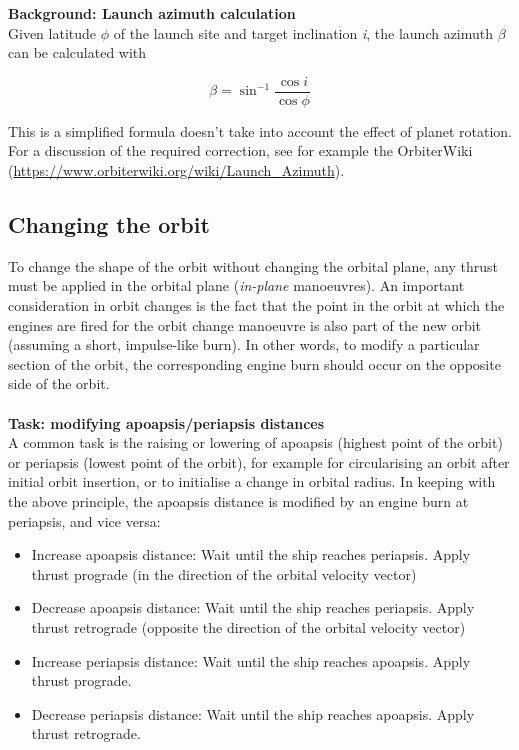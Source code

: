 \documentclass[Orbiter User Manual.tex]{subfiles}
\begin{document}
\noindent
\textbf{Background: Launch azimuth calculation}\\
Given latitude $\phi$ of the launch site and target inclination \textit{i}, the launch azimuth $\beta$ can be calculated with

\[ \beta = \sin^{-1} \frac{\cos i}{\cos \phi} \]

\noindent
This is a simplified formula doesn't take into account the effect of planet rotation. For a discussion of the required correction, see for example the OrbiterWiki (\url{https://www.orbiterwiki.org/wiki/Launch_Azimuth}).


\subsection{Changing the orbit}
\label{ssec:basic_changeorbit}
To change the shape of the orbit without changing the orbital plane, any thrust must be applied in the orbital plane (\textit{in-plane} manoeuvres). An important consideration in orbit changes is the fact that the point in the orbit at which the engines are fired for the orbit change manoeuvre is also part of the new orbit (assuming a short, impulse-like burn). In other words, to modify a particular section of the orbit, the corresponding engine burn should occur on the opposite side of the orbit.\\
\\
\textbf{Task: modifying apoapsis/periapsis distances}\\
A common task is the raising or lowering of apoapsis (highest point of the orbit) or periapsis (lowest point of the orbit), for example for circularising an orbit after initial orbit insertion, or to initialise a change in orbital radius. In keeping with the above principle, the apoapsis distance is modified by an engine burn at periapsis, and vice versa:

\begin{itemize}
\item Increase apoapsis distance: Wait until the ship reaches periapsis. Apply thrust prograde (in the direction of the orbital velocity vector)
\item Decrease apoapsis distance: Wait until the ship reaches periapsis. Apply thrust retrograde (opposite the direction of the orbital velocity vector)
\item Increase periapsis distance: Wait until the ship reaches apoapsis. Apply thrust prograde.
\item Decrease periapsis distance: Wait until the ship reaches apoapsis. Apply thrust retrograde.
\end{itemize}
\end{document}
